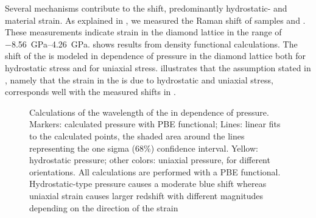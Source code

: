 	Several mechanisms contribute to the \cwl shift, predominantly hydrostatic- and material strain.
	As explained in , we measured the Raman shift of samples \insituS and \implantedTao.
	These measurements indicate strain in the diamond lattice in the range of \SIrange{-8.56}{4.26}{\giga\pascal}.
	 shows results from density functional calculations.
	The shift of the  \ZPL is modeled in dependence of pressure in the diamond lattice both for hydrostatic stress and for uniaxial stress.
	 illustrates that the assumption stated in , namely that the strain in the \nds is due to hydrostatic and uniaxial stress, corresponds well with the measured \ZPL shifts in \vl.

		\begin{figure}[htp]
			\centering
			\caption[Calculated dependence between \siv \ZPL and lattice pressure]{Calculations of the wavelength of the \siv \ZPL in dependence of pressure. Markers: calculated pressure with PBE functional; Lines: linear fits to the calculated points, the shaded area around the lines representing the one sigma (68\%) confidence interval. Yellow: hydrostatic pressure; other colors: uniaxial pressure, for different orientations. All calculations are performed with a PBE functional. Hydrostatic-type pressure causes a moderate blue shift whereas uniaxial strain causes larger redshift with different magnitudes depending on the direction of the strain}
			\label{fig::stress_pressure}
		\end{figure}

